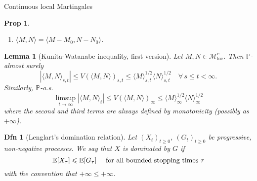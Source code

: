 \documentclass[a4paper]{article}
\theoremstyle{mytheoremstyle}
\newtheorem{definition}{Dfn}
\newtheorem{lemma}{Lemma}
\newtheorem{proposition}{Prop}
\newcommand{\1}{\mathds{1}}
\begin{document}
\begin{multicols*}{3}
\begin{roundbox}{Continuous local Martingales}
\begin{proposition}
\begin{enumerate}
    \item $\langle M, N \rangle = \langle M - M_0, N - N_0 \rangle$.
  \end{enumerate}
\end{proposition}
\end{roundbox}

\begin{unlabeledbox}
\begin{lemma}[Kunita-Watanabe inequality, first version]
  \label{lem:kunita-wanatabe.v1}Let $M, N \in \mathcal{M}_{\operatorname{loc}}^c$.
  Then $\mathbb{P}$-almost surely
  \[ | \langle M, N \rangle_{s, t} | \leqslant V (\langle M, N \rangle)_{s, t}
     \leqslant \langle M \rangle_{s, t}^{1 / 2} \langle N \rangle_{s, t}^{1 /
     2}  \quad \forall \, s \leqslant t < \infty . \]
  Similarly, $\mathbb{P}$-a.s.
  \[ \limsup_{t \rightarrow \infty} | \langle M, N \rangle_t | \leqslant V
     (\langle M, N \rangle)_{\infty} \leqslant \langle M \rangle_{\infty}^{1 /
     2} \langle N \rangle_{\infty}^{1 / 2} \]
  where the second and third terms are always defined by monotonicity
  (possibly as $+ \infty$). 
\end{lemma}

\begin{definition}[Lenglart's domination relation]
  \label{defn:lenglart.domination}Let $(X_t)_{t \geqslant 0}$, $(G_t)_{t
  \geqslant 0}$ be progressive, non-negative processes. We say that $X$ is
  {\emph{dominated}} by $G$ if
  \begin{equation}
    \vspace{-0.5em}
    \mathbb{E} [X_{\tau}] \leqslant \mathbb{E} [G_{\tau}] \quad \text{ for all
    bounded stopping times } \tau \label{eq:lenglart.domination}
    \vspace{-0.5em}
  \end{equation}
  with the convention that $+ \infty \leqslant + \infty$.
\end{definition}


\end{unlabeledbox}
\end{multicols*}
\end{document}
